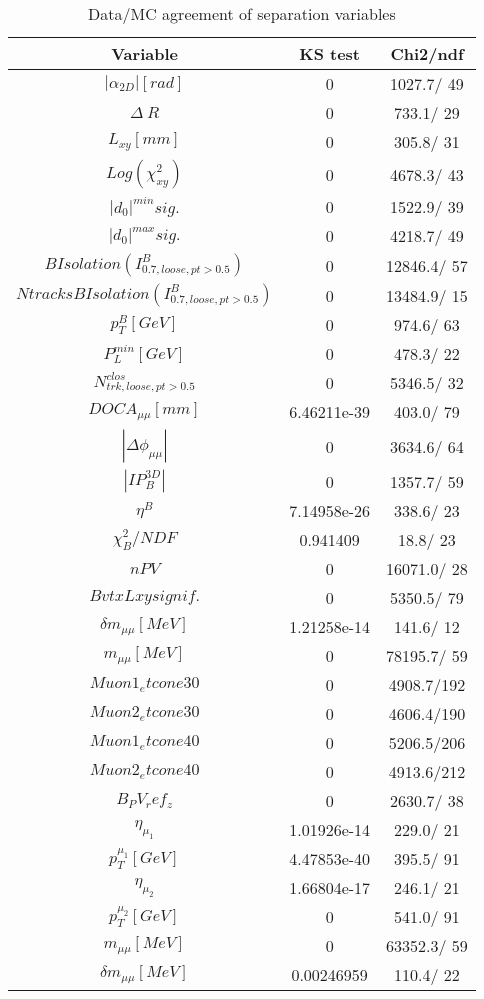 \documentclass{article}
\begin{document}
\begin{table}[htbp]
\caption{\label{tab:sepVars}Data/MC agreement of separation variables}
\begin{center}
\begin{tabular}{c|c|c}
Variable & KS test & Chi2/ndf \\
\hline
$|\alpha_{2D}| [rad]$ & 0 & 1027.7/ 49\\
\hline
$\Delta~R$ & 0 & 733.1/ 29\\
\hline
$L_{xy} [mm]$ & 0 & 305.8/ 31\\
\hline
$Log(\chi^{2}_{xy})$ & 0 & 4678.3/ 43\\
\hline
$|d_{0}|^{min} sig.$ & 0 & 1522.9/ 39\\
\hline
$|d_{0}|^{max} sig.$ & 0 & 4218.7/ 49\\
\hline
$B Isolation (I^{B}_{0.7, loose, pt>0.5})$ & 0 & 12846.4/ 57\\
\hline
$Ntracks B Isolation (I^{B}_{0.7, loose, pt>0.5})$ & 0 & 13484.9/ 15\\
\hline
$p_{T}^{B} [GeV]$ & 0 & 974.6/ 63\\
\hline
$P^{min}_{L} [GeV]$ & 0 & 478.3/ 22\\
\hline
$N^{clos}_{trk, loose, pt>0.5}$ & 0 & 5346.5/ 32\\
\hline
$DOCA_{\mu\mu} [mm]$ & 6.46211e-39 & 403.0/ 79\\
\hline
$|\Delta\phi_{\mu\mu}|$ & 0 & 3634.6/ 64\\
\hline
$|IP_{B}^{3D}|$ & 0 & 1357.7/ 59\\
\hline
$\eta^{B}$ & 7.14958e-26 & 338.6/ 23\\
\hline
$\chi^{2}_{B}/NDF$ & 0.941409 &  18.8/ 23\\
\hline
$nPV$ & 0 & 16071.0/ 28\\
\hline
$BvtxLxy signif.$ & 0 & 5350.5/ 79\\
\hline
$\delta m_{\mu\mu} [MeV]$ & 1.21258e-14 & 141.6/ 12\\
\hline
$m_{\mu\mu} [MeV]$ & 0 & 78195.7/ 59\\
\hline
$Muon1_etcone30$ & 0 & 4908.7/192\\
\hline
$Muon2_etcone30$ & 0 & 4606.4/190\\
\hline
$Muon1_etcone40$ & 0 & 5206.5/206\\
\hline
$Muon2_etcone40$ & 0 & 4913.6/212\\
\hline
$B_PV_ref_z$ & 0 & 2630.7/ 38\\
\hline
$\eta_{\mu_{1}}$ & 1.01926e-14 & 229.0/ 21\\
\hline
$p_{T}^{\mu_{1}} [GeV]$ & 4.47853e-40 & 395.5/ 91\\
\hline
$\eta_{\mu_{2}}$ & 1.66804e-17 & 246.1/ 21\\
\hline
$p_{T}^{\mu_{2}} [GeV]$ & 0 & 541.0/ 91\\
\hline
$m_{\mu\mu} [MeV]$ & 0 & 63352.3/ 59\\
\hline
$\delta m_{\mu\mu} [MeV]$ & 0.00246959 & 110.4/ 22\\
\hline
\end{tabular}
\end{center}
\end{table}
\end{document}
